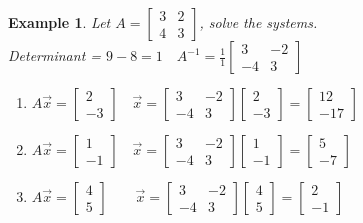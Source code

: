 \documentclass[a4paper,12pt,openany]{book}
\theoremstyle{defn}
\theoremstyle{expl}
\newtheorem{expl}{Example}[section]
\begin{document}
\begin{expl}\textup{Let $A=\left[\begin{array}{cc}3&2\\4&3\end{array}\right]$, solve the systems.\\
Determinant = $9-8=1\quad A^{-1}=\frac{1}{1}\left[\begin{array}{rr}3&-2\\-4&3\end{array}\right]$}
\begin{enumerate}
\item $A\vec{x}=\left[\begin{array}{r}2\\-3\end{array}\right] \quad \vec{x}=\left[\begin{array}{rr}3&-2\\-4&3\end{array}\right]\left[\begin{array}{r}2\\-3\end{array}\right]=\left[\begin{array}{r}12\\-17\end{array}\right] $
\item $A\vec{x}=\left[\begin{array}{r}1\\-1\end{array}\right]\quad \vec{x}=\left[\begin{array}{rr}3&-2\\-4&3\end{array}\right]\left[\begin{array}{r}1\\-1\end{array}\right]=\left[\begin{array}{r}5\\-7\end{array}\right] $
\item $A\vec{x}=\left[\begin{array}{r}4\\5\end{array}\right]\qquad \vec{x}=\left[\begin{array}{rr}3&-2\\-4&3\end{array}\right]\left[\begin{array}{r}4\\5\end{array}\right]=\left[\begin{array}{r}2\\-1\end{array}\right] $
\end{enumerate}
\end{expl}
\end{document}
